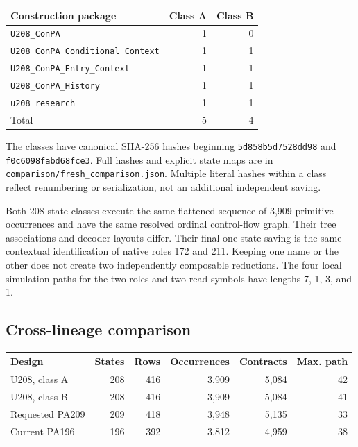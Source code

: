 \documentclass[11pt,a4paper]{article}
\newcommand{\code}[1]{\nolinkurl{#1}}
\begin{document}
\begin{center}
\begin{tabular}{lrr}
\toprule
Construction package & Class A & Class B\\
\midrule
\code{U208_ConPA} &1&0\\
\code{U208_ConPA_Conditional_Context}&1&1\\
\code{U208_ConPA_Entry_Context}&1&1\\
\code{U208_ConPA_History}&1&1\\
\code{u208_research}&1&1\\
\midrule
Total &5&4\\
\bottomrule
\end{tabular}
\end{center}

The classes have canonical SHA-256 hashes beginning \code{5d858b5d7528dd98} and \code{f0c6098fabd68fce3}. Full hashes and explicit state maps are in \code{comparison/fresh_comparison.json}. Multiple literal hashes within a class reflect renumbering or serialization, not an additional independent saving.

Both 208-state classes execute the same flattened sequence of 3,909 primitive occurrences and have the same resolved ordinal control-flow graph. Their tree associations and decoder layouts differ. Their final one-state saving is the same contextual identification of native roles 172 and 211. Keeping one name or the other does not create two independently composable reductions. The four local simulation paths for the two roles and two read symbols have lengths 7, 1, 3, and 1.

\subsection{Cross-lineage comparison}

\begin{center}
\begin{tabular}{lrrrrr}
\toprule
Design & States & Rows & Occurrences & Contracts & Max. path\\
\midrule
U208, class A &208&416&3,909&5,084&42\\
U208, class B &208&416&3,909&5,084&41\\
Requested PA209 &209&418&3,948&5,135&33\\
Current PA196 &196&392&3,812&4,959&38\\
\bottomrule
\end{tabular}
\end{center}
\end{document}

